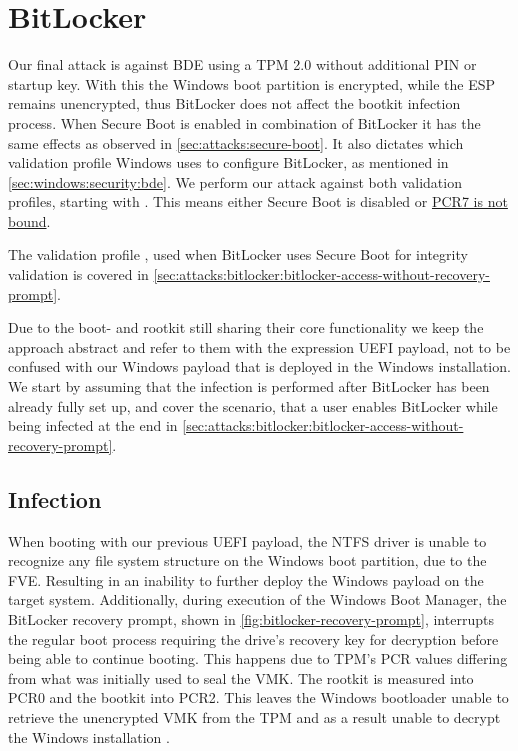 \section{BitLocker}

Our final attack is against \ac{BDE} using a \ac{TPM} 2.0 without additional \ac{PIN} or startup key.
With this the Windows boot partition is encrypted, while the \ac{ESP} remains unencrypted, thus BitLocker does not affect the bootkit infection process.
When Secure Boot is enabled in combination of BitLocker it has the same effects as observed in \autoref{sec:attacks:secure-boot}.
It also dictates which validation profile Windows uses to configure BitLocker, as mentioned in \autoref{sec:windows:security:bde}.
We perform our attack against both validation profiles, starting with \hyperref[tab:pcr-usage]{}.
This means either Secure Boot is disabled or \hyperlink{pcr7-binding}{\ac{PCR}7 is not bound}.

The validation profile \hyperref[tab:pcr-usage]{}, used when BitLocker uses Secure Boot for integrity validation is covered in \autoref{sec:attacks:bitlocker:bitlocker-access-without-recovery-prompt}.

Due to the boot- and rootkit still sharing their core functionality we keep the approach abstract and refer to them with the expression \ac{UEFI} payload, not to be confused with our Windows payload that is deployed in the Windows installation.
We start by assuming that the infection is performed after BitLocker has been already fully set up, and cover the scenario, that a user enables BitLocker while being infected at the end in \autoref{sec:attacks:bitlocker:bitlocker-access-without-recovery-prompt}.


\subsection{Infection}

When booting with our previous \ac{UEFI} payload, the \ac{NTFS} driver is unable to recognize any file system structure  on the Windows boot partition, due to the \ac{FVE}.
Resulting in an inability to further deploy the Windows payload on the target system.
Additionally, during execution of the Windows Boot Manager, the BitLocker recovery prompt, shown in \autoref{fig:bitlocker-recovery-prompt}, interrupts the regular boot process requiring the drive's recovery key for decryption before being able to continue booting.
This happens due to \ac{TPM}'s \ac{PCR} values differing from what was initially used to seal the \ac{VMK}.
The rootkit is measured into \ac{PCR}0 and the bootkit into \ac{PCR}2.
This leaves the Windows bootloader unable to retrieve the unencrypted \ac{VMK} from the \ac{TPM} and as a result unable to decrypt the Windows installation \cite[Section 12]{windows-internals-7-part2}.

